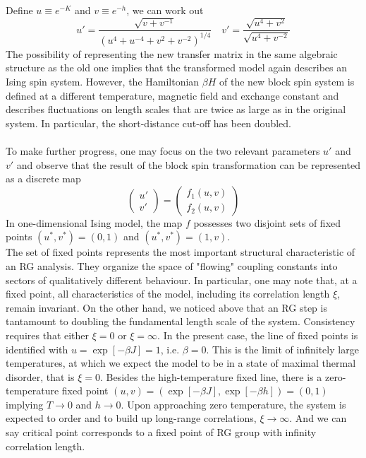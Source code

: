 \documentclass[cyan]{elegantnote}
\begin{document}
Define $u \equiv e^{-K}$ and $v \equiv e^{-h}$, we can work out
\[u' = \frac{\sqrt{v+v^{-1}}}{(u^4 + u^{-4} + v^2 + v^{-2})^{1/4}} \quad v' = \frac{\sqrt{u^4 + v^2}}{\sqrt{u^4 + v^{-2}}}\]
The possibility of representing the new transfer matrix in the same algebraic structure as the old one implies that the transformed model again describes an Ising spin system. However, the Hamiltonian $\beta H$ of the new block spin system is defined at a different temperature, magnetic field and exchange constant and describes fluctuations on length scales that are twice as large as in the original system.
In particular, the short-distance cut-off has been doubled.
\\ \\
To make further progress, one may focus on the two relevant parameters $u'$ and $v'$ and observe that the result of the block spin transformation can be represented as a discrete map
\[\begin{pmatrix} u' \\ v' \end{pmatrix} = \begin{pmatrix}
f_1(u,v) \\ f_2(u,v)
\end{pmatrix} \]
In one-dimensional Ising model, the map $f$ possesses two
disjoint sets of fixed points $(u^*,v^*) = (0,1)$ and $(u^*,v^*) = (1,v)$.
\\
The set of fixed points represents the most important structural characteristic of an RG analysis. They organize the space of "flowing" coupling constants into sectors of qualitatively different behaviour. 
In particular, one may note that, at a fixed point, all characteristics of the model, including its correlation length $\xi$, remain invariant. 
On the other hand, we noticed above that an RG step is tantamount to doubling the fundamental length scale of the system. Consistency requires that either $\xi = 0$ or $\xi = \infty$. 
In the present case, the line of fixed points is identified with $u = \exp[-\beta J] = 1$, i.e. $\beta = 0$. 
This is the limit of infinitely large temperatures, at which we expect the model to be in a state of maximal thermal disorder, that is $\xi = 0$. 
Besides the high-temperature fixed line, there is a zero-temperature fixed point $(u, v) = (\exp[−\beta J], \exp[−\beta h]) = (0, 1)$ implying $T \to 0$ and $h \to 0$. Upon approaching zero temperature, the system is expected to order and to build up long-range correlations, $\xi \to \infty$. And we can say critical point corresponds to a fixed point of RG group with infinity correlation length.
\end{document}
